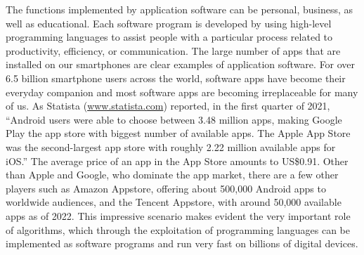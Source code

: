The functions implemented by application software can be personal, business, as well as educational. Each software program is developed by using high-level programming languages to assist people with a particular process related to productivity, efficiency, or communication. The large number of apps that are installed on our smartphones are clear examples of application software. For over 6.5 billion smartphone users across the world, software apps have become their everyday companion and most software apps are becoming irreplaceable for many of us. As Statista (\href{https://www.statista.com}{www.statista.com}) reported, in the first quarter of 2021, ``Android users were able to choose between 3.48 million apps, making Google Play the app store with biggest number of available apps. The Apple App Store was the second-largest app store with roughly 2.22 million available apps for iOS.'' The average price of an app in the App Store amounts to US\$0.91. Other than Apple and Google, who dominate the app market, there are a few other players such as Amazon Appstore, offering about 500,000 Android apps to worldwide audiences, and the Tencent Appstore, with around 50,000 available apps as of 2022. This impressive scenario makes evident the very important role of algorithms, which through the exploitation of programming languages can be implemented as software programs and run very fast on billions of digital devices.


